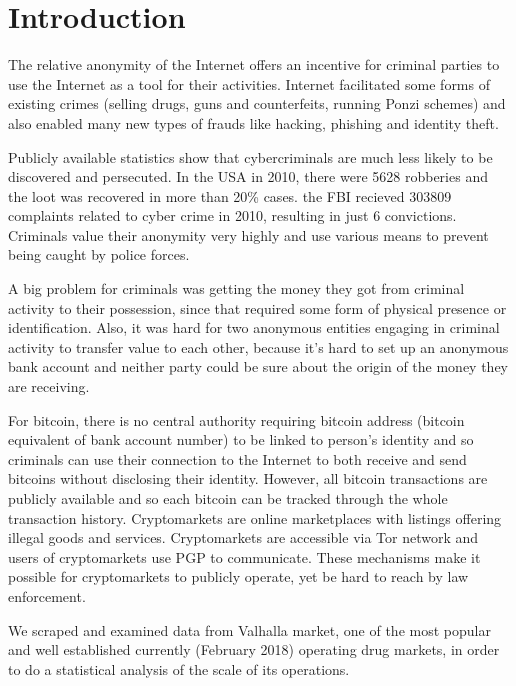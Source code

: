 \documentclass[
  digital, %
  table,   %
  lof,     %
  lot,     %
  oneside
]{fithesis3}
\begin{document}
\chapter{Introduction}

The relative anonymity of the Internet offers an incentive for criminal parties to use the Internet as a tool for their activities.
Internet facilitated some forms of existing crimes (selling drugs, guns and
counterfeits, running Ponzi schemes) and also enabled many new types of frauds like hacking, phishing and identity theft.

Publicly available statistics show that cybercriminals are much
 less likely to be discovered and persecuted.
 In the USA in 2010, there were 5628 robberies and the loot was recovered in more than 20\% cases. \parencite{fbi10} 
 the FBI recieved 303809 complaints related to cyber crime in 2010, resulting in just 6 convictions. \parencite{fbcyber} 
Criminals value their anonymity very highly and use various means to prevent being caught by police forces.
\parencite{tzanetakis2016transparency}
\parencite{van2013surfing}
\parencite{aldridge2014not}

A big problem for criminals was getting the money they got from criminal activity to their possession,
since that required some form of physical presence or identification.
Also, it was hard for two anonymous entities engaging in criminal activity to transfer value to each other,
 because it's hard to set up an anonymous bank account and neither party could be sure about the origin of
 the money they are receiving.

For bitcoin, there is no central authority requiring bitcoin address
(bitcoin equivalent of bank account number) to be linked to person's identity and so 
criminals can use their connection to the Internet to both receive and send bitcoins without disclosing their identity.
However, all bitcoin transactions are publicly available and so each bitcoin can be tracked through the whole transaction history.
 Cryptomarkets are online marketplaces with listings offering illegal goods and services.
 Cryptomarkets are accessible via Tor network and users of cryptomarkets use PGP to communicate. 
These mechanisms make it possible for cryptomarkets to publicly operate, yet be hard to reach by law enforcement.
\parencite{cox2016staying}

We scraped and examined data from Valhalla market,
 one of the most popular and well established currently (February 2018) operating drug markets,
in order to do a statistical analysis of the scale of its operations.
\end{document}
